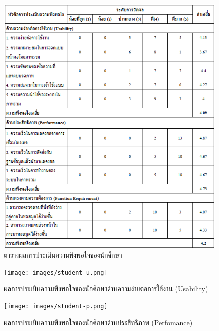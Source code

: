 \begin{figure}[ht]
    \centering
    \includegraphics[width=\textwidth]{images/table-st.png}
    \caption[ตารางผลการประเมินความพึงพอใจของนักศึกษา]{ตารางผลการประเมินความพึงพอใจของนักศึกษา}
\label{fig:table-st}
\end{figure}

\newpage
\begin{figure}[ht]
    \centering
    \texttt{[image: images/student-u.png]}
    \caption[ผลการประเมินความพึงพอใจของนักศึกษาด้านความง่ายต่อการใช้งาน (Usability)]{ผลการประเมินความพึงพอใจของนักศึกษาด้านความง่ายต่อการใช้งาน (Usability)}
    \label{fig:st-u}
\end{figure}

\begin{figure}[ht]
    \centering
    \texttt{[image: images/student-p.png]}
    \caption[ผลการประเมินความพึงพอใจของนักศึกษาด้านประสิทธิภาพ (Perfomance)]{ผลการประเมินความพึงพอใจของนักศึกษาด้านประสิทธิภาพ (Perfomance)}
    \label{fig:st-p}
\end{figure}

